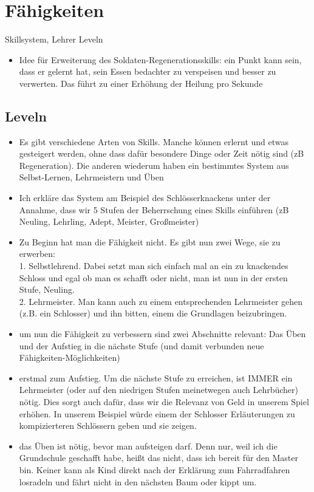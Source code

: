 \chapter{Fähigkeiten}
Skillsystem, Lehrer
Leveln
\begin{itemize}
	\item Idee für Erweiterung des Soldaten-Regenerationsskills: ein Punkt kann sein, dass er gelernt hat, sein Essen bedachter zu verspeisen und besser zu verwerten. Das führt zu einer Erhöhung der Heilung pro Sekunde
\end{itemize}

\section{Leveln}
\begin{itemize}
	\item Es gibt verschiedene Arten von Skills. Manche können erlernt und etwas gesteigert werden, ohne dass dafür besondere Dinge oder Zeit nötig sind (zB Regeneration). Die anderen wiederum haben ein bestimmtes System aus Selbst-Lernen, Lehrmeistern und Üben
	\item Ich erkläre das System am Beispiel des Schlösserknackens unter der Annahme, dass wir 5 Stufen der Beherrschung eines Skills einführen (zB Neuling, Lehrling, Adept, Meister, Großmeister)
	\item Zu Beginn hat man die Fähigkeit nicht. Es gibt nun zwei Wege, sie zu erwerben:\\
	1. Selbstlehrend. Dabei setzt man sich einfach mal an ein zu knackendes Schloss und egal ob man es schafft oder nicht, man ist nun in der ersten Stufe, Neuling. \\
	2. Lehrmeister. Man kann auch zu einem entsprechenden Lehrmeister gehen (z.B. ein Schlosser) und ihn bitten, einem die Grundlagen beizubringen.
	\item um nun die Fähigkeit zu verbessern sind zwei Abschnitte relevant: Das Üben und der Aufstieg in die nächste Stufe (und damit verbunden neue Fähigkeiten-Möglichkeiten)
	\item erstmal zum Aufstieg. Um die nächste Stufe zu erreichen, ist IMMER ein Lehrmeister (oder auf den niedrigen Stufen meinetwegen auch Lehrbücher) nötig. Dies sorgt auch dafür, dass wir die Relevanz von Geld in unserem Spiel erhöhen.
	In unserem Beispiel würde einem der Schlosser Erläuterungen zu kompizierteren Schlössern geben und sie zeigen.
	\item das Üben ist nötig, bevor man aufsteigen darf. Denn nur, weil ich die Grundschule geschafft habe, heißt das nicht, dass ich bereit für den Master bin. Keiner kann als Kind direkt nach der Erklärung zum Fahrradfahren losradeln und fährt nicht in den nächsten Baum oder kippt um.

\end{itemize}
